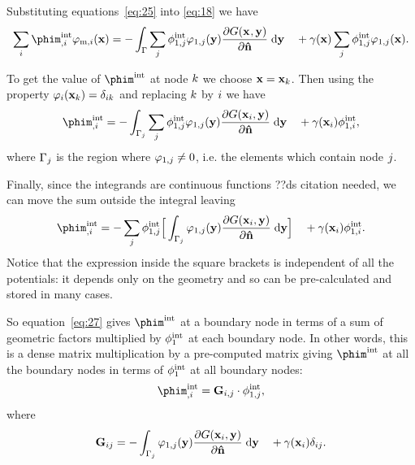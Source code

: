 Substituting equations~\eqref{eq:25} into \eqref{eq:18} we have
\begin{equation*}
  \sum_\ibasis \phim_{,\ibasis}^\inte \tbf_{\text{m},\ibasis}(\xv) =
  - \int_{\boundd} \sum_\ibasisb \phi^\inte_{1,\ibasisb} \tbf_{1,\ibasisb}(\yv)
  \pd{\Green}{\nv} \d \yv
  \quad + \gamma(\xv) \sum_\ibasisb \phi^\inte_{1,\ibasisb} \tbf_{1,\ibasisb}(\xv).
\end{equation*}

To get the value of $\phim^\inte$ at node ${k}$ we choose $\mathbf{x} = \mathbf{x}_{k}$. Then using the property $\varphi_{i}(\mathbf{x}_{k}) = \delta_{{i} {k}}$ and replacing ${k}$ by ${i}$ we have
\begin{equation}
  \phim_{,\ibasis}^\inte =
  - \int_{\boundd_\ibasisb} \sum_\ibasisb \phi^\inte_{1,\ibasisb} \tbf_{1,\ibasisb}(\yv)
  \pd{\Green[\ibasis]}{\nv} \d \yv
  \quad + \gamma(\xv_\ibasis) \phi^\inte_{1,\ibasis},
  \label{eq:colocation}
\end{equation}
where ${{\Gamma}_{j}}$ is the region where $\varphi_{1,{j}} \neq 0$, i.e. the elements which contain node ${j}$.

Finally, since the integrands are continuous functions ??ds citation needed, we can move the sum outside the integral leaving
\begin{equation}
  \phim_{,\ibasis}^\inte =
  - \sum_\ibasisb \phi^\inte_{1,\ibasisb} \Big[ \int_{\boundd_\ibasisb} \tbf_{1,\ibasisb}(\yv)
  \pd{\Green[\ibasis]}{\nv} \d \yv \Big]
  \quad + \gamma(\xv_\ibasis) \phi^\inte_{1,\ibasis}.
\label{eq:27}
\end{equation}
Notice that the expression inside the square brackets is independent of all the potentials: it depends only on the geometry and so can be pre-calculated and stored in many cases.

So equation~\eqref{eq:27} gives $\phim^\inte$ at a boundary node in terms of a sum of geometric factors multiplied by $\phi^{\text{int}}_1$ at each boundary node.
In other words, this is a dense matrix multiplication by a pre-computed matrix giving $\phim^\inte$ at all the boundary nodes in terms of $\phi^{\text{int}}_1$ at all boundary nodes:
\begin{equation}
  \label{eq:10}
  \phim_{,\ibasis}^\inte = \bm_{\ibasis,\ibasisb} \cdot \phi_{1,\ibasisb}^\inte,
\end{equation}
where
\begin{equation}
  \label{eq:17}
  \bm_{\ibasis\ibasisb} = - \int_{\boundd_\ibasisb} \tbf_{1,\ibasisb}(\yv) \pd{\Green[\ibasis]}{\nv} \d \yv
  \quad + \gamma(\xv_\ibasis)\delta_{\ibasis\ibasisb}.
\end{equation}


